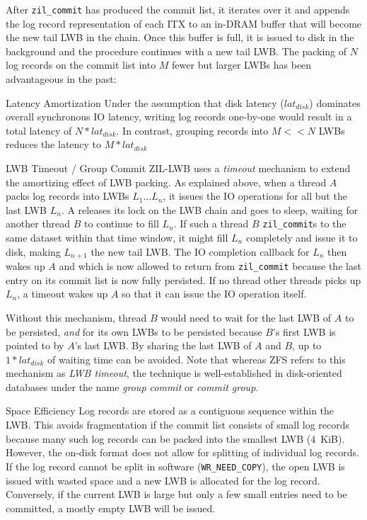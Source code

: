 \documentclass[12pt,a4paper,twoside]{book}
\begin{document}
After \lstinline{zil_commit} has produced the commit list, it iterates over it and appends the log record representation of each ITX to an in-DRAM buffer that will become the new tail LWB in the chain.
Once this buffer is full, it is issued to disk in the background and the procedure continues with a new tail LWB.
The packing of $N$ log records on the commit list into $M$ fewer but larger LWBs has been advantageous in the past:
\begin{description}[noitemsep]
    \item[Latency Amortization]
        Under the assumption that disk latency ($lat_{disk}$) dominates overall synchronous IO latency, writing log records one-by-one would result in a total latency of $N * lat_{disk}$.
        In contrast, grouping records into $M << N$ LWBs reduces the latency to $M * lat_{disk}$
    \item[LWB Timeout / Group Commit]
        ZIL-LWB uses a \textit{timeout} mechanism to extend the amortizing effect of LWB packing.
        As explained above, when a thread $A$ packs log records into LWBs $L_1 \dots L_n$, it issues the IO operations for all but the last LWB $L_n$.
        A releases its lock on the LWB chain and goes to sleep, waiting for another thread $B$ to continue to fill $L_n$.
        If such a thread $B$ \lstinline{zil_commit}s to the same dataset within that time window, it might fill $L_n$ completely and issue it to disk, making $L_{n+1}$ the new tail LWB.
        The IO completion callback for $L_n$ then wakes up $A$ and which is now allowed to return from \lstinline{zil_commit} because the last entry on its commit list is now fully persisted.
        If no thread other threads picks up $L_n$, a timeout wakes up $A$ so that it can issue the IO operation itself.

        Without this mechanism, thread $B$ would need to wait for the last LWB of $A$ to be persisted, \textit{and} for its own LWBs to be persisted because $B$'s first LWB is pointed to by $A$'s last LWB.
        By sharing the last LWB of $A$ and $B$, up to $1 * lat_{disk}$ of waiting time can be avoided.
        Note that whereas ZFS refers to this mechanism as \textit{LWB timeout}, the technique is well-established in disk-oriented databases under the name \textit{group commit} or \textit{commit group}.

    \item[Space Efficiency]
        Log records are stored as a contiguous sequence within the LWB.
        This avoids fragmentation if the commit list consists of small log records because many such log records can be packed into the smallest LWB (4~KiB).
        However, the on-disk format does not allow for splitting of individual log records.
        If the log record cannot be split in software (\lstinline{WR_NEED_COPY}), the open LWB is issued with wasted space and a new LWB is allocated for the log record.
        Conversely, if the current LWB is large but only a few small entries need to be committed, a mostly empty LWB will be issued.
\end{description}
\end{document}
